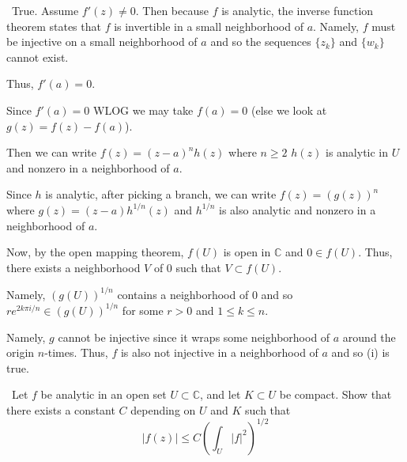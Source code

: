 \documentclass[12pt]{Qual}
\begin{document}
\begin{solution}$\,$
 True. Assume $f'(z)\not=0.$ Then because $f$ is analytic, the inverse function theorem states that $f$ is invertible in a small neighborhood of $a$. Namely, $f$ must be injective on a small neighborhood of $a$ and so the sequences $\{z_k\}$ and $\{w_k\}$ cannot exist.

Thus, $f'(a)=0$.

 Since $f'(a)=0$ WLOG we may take $f(a)=0$ (else we look at $g(z)=f(z)-f(a)$).

Then we can write $f(z)=(z-a)^nh(z)$ where $n\ge 2$ $h(z)$ is analytic in $U$ and nonzero in a neighborhood of $a.$

Since $h$ is analytic, after picking a branch, we can write $f(z)=(g(z))^n$ where $g(z)=(z-a)h^{1/n}(z)$ and $h^{1/n}$ is also analytic and nonzero in a neighborhood of $a.$

Now, by the open mapping theorem, $f(U)$ is open in $\mathbb{C}$ and $0\in f(U).$ Thus, there exists a neighborhood $V$ of $0$ such that $V\subset f(U).$

Namely, $(g(U))^{1/n}$ contains a neighborhood of $0$ and so $re^{2k\pi i/n}\in (g(U))^{1/n}$ for some $r>0$ and $1\le k\le n$.

Namely, $g$ cannot be injective since it wraps some neighborhood of $a$ around the origin $n$-times. Thus, $f$ is also not injective in a neighborhood of $a$ and so (i) is true.
\end{solution}
\newpage





\begin{problem} $\,$
Let $f$ be analytic in an open set $U\subset\mathbb{C}$, and let $K\subset U$ be compact. Show that there exists a constant $C$ depending on $U$ and $K$ such that $$|f(z)|\le C\left(\int_U|f|^2\right)^{1/2}$$
\end{problem}
\end{document}
